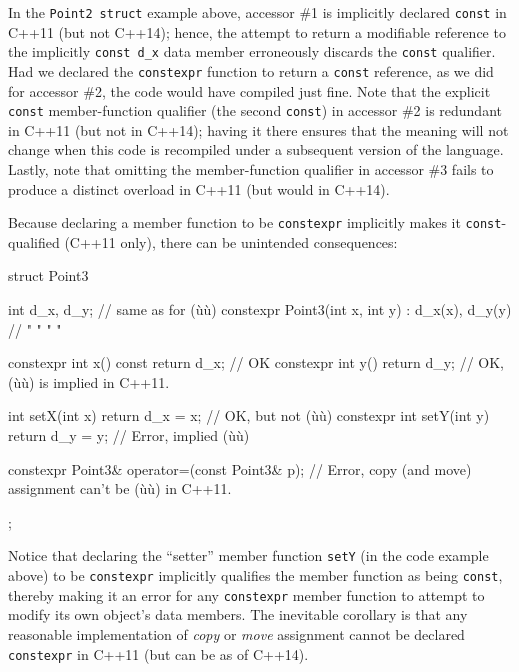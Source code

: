 \noindent In the \lstinline!Point2!~\lstinline!struct! example above, accessor \#1 is
implicitly declared \lstinline!const! in C++11 (but not C++14); hence, the
attempt to return a modifiable  reference to the implicitly
\lstinline!const!~\lstinline!d_x! data member erroneously discards the
\lstinline!const! qualifier. Had we declared the \lstinline!constexpr!
function to return a \lstinline!const! reference, as we did for accessor
\#2, the code would have compiled just fine. Note that the explicit
\lstinline!const! member-function qualifier (the second \lstinline!const!) in
accessor \#2 is redundant in C++11 (but not in C++14); having it there
ensures that the meaning will not change when this code is recompiled
under a subsequent version of the language. Lastly, note that omitting
the member-function qualifier in accessor \#3 fails to produce a
distinct overload in C++11 (but would in C++14).

Because declaring a member function to be \lstinline!constexpr! implicitly
makes it \lstinline!const!-qualified (C++11 only), there can be unintended
consequences:

\begin{emcppslisting}
struct Point3
{
    int d_x, d_y;                                        // same as for (ù{}ù)
    constexpr Point3(int x, int y) : d_x(x), d_y(y) { }  //   "  "   "     "

    constexpr int x() const { return d_x; }  // OK
    constexpr int y()       { return d_y; }  // OK, (ù{}ù) is implied in C++11.

              int setX(int x) { return d_x = x; }  // OK, but not (ù{}ù)
    constexpr int setY(int y) { return d_y = y; }  // Error, implied (ù{}ù)

    constexpr Point3& operator=(const Point3& p);
        // Error, copy (and move) assignment can't be (ù{}ù) in C++11.

};
\end{emcppslisting}


\noindent Notice that declaring the ``setter'' member function \lstinline!setY! (in
the code example above) to be \lstinline!constexpr! implicitly qualifies
the member function as being \lstinline!const!, thereby making it an error
for any \lstinline!constexpr! member function to attempt to modify its own
object's data members. The inevitable corollary is that any reasonable
implementation of \emph{copy} or \emph{move} assignment cannot be
declared \lstinline!constexpr! in C++11 (but can be as of C++14).

